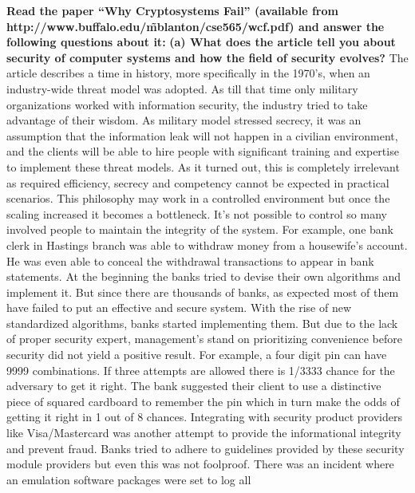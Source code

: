 \documentclass{article}
\begin{document}
\textbf{
Read the paper “Why Cryptosystems Fail” (available from http://www.buffalo.edu/\~mblanton/cse565/wcf.pdf) and answer the following questions about it:}
\newline \newline \textbf{(a) What does the article tell you about security of computer systems and how the field of security evolves?}
\newline \newline The article describes a time in history, more specifically in the 1970's, when an industry-wide threat model was adopted. As till that time only military organizations worked with information security, the industry tried to take advantage of their wisdom. As military model stressed secrecy, it was an assumption that the information leak will not happen in a civilian environment, and the clients will be able to hire people with significant training and expertise to implement these threat models. As it turned out, this is completely irrelevant as required efficiency, secrecy and competency cannot be expected in practical scenarios.
\newline \newline This philosophy may work in a controlled environment but once the scaling increased it becomes a bottleneck. It's not possible to control so many involved people to maintain the integrity of the system. For example, one bank clerk in Hastings branch was able to withdraw money from a housewife's account. He was even able to conceal the withdrawal transactions to appear in bank statements.
\newline \newline At the beginning the banks tried to devise their own algorithms and implement it. But since there are thousands of banks, as expected most of them have failed to put an effective and secure system. 
\newline \newline With the rise of new standardized algorithms, banks started implementing them. But due to the lack of proper security expert, management's stand on prioritizing convenience before security did not yield a positive result. For example, a four digit pin can have 9999 combinations. If three attempts are allowed there is 1/3333 chance for the adversary to get it right. The bank suggested their client to use a distinctive piece of squared cardboard to remember the pin which in turn make the odds of getting it right in 1 out of 8 chances.
\newline \newline Integrating with security product providers like Visa/Mastercard was another attempt to provide the informational integrity and prevent fraud. Banks tried to adhere to guidelines provided by these security module providers but even this was not foolproof. There was an incident where an emulation software packages were set to log all
\end{document}
